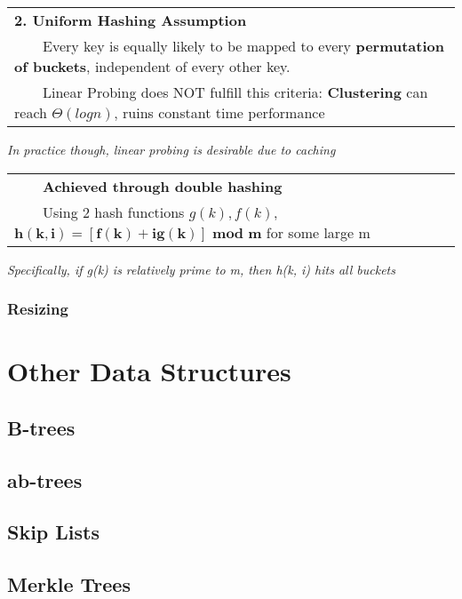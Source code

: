 \documentclass{article}
\newcommand{\tabitem}{~~\llap{\textbullet}~~}
\begin{document}
    \noindent\begin{tabular}{l}
        \textbf{2. Uniform Hashing Assumption}\\
        \tabitem Every key is equally likely to be mapped to every \textbf{permutation of buckets}, independent of every other key.\\
        \tabitem Linear Probing does NOT fulfill this criteria: \textbf{Clustering} can reach $\Theta(logn)$, ruins constant time performance\\
    \end{tabular}

    \emph{In practice though, linear probing is desirable due to caching}

    \noindent\begin{tabular}{l}
        \tabitem\textbf{Achieved through double hashing}\\
        \tabitem Using 2 hash functions $g(k), f(k)$, $\bm{h(k, i) = [f(k) + ig(k)]}$ $\bm{mod}$ \textbf{m} for some large m\\
    \end{tabular}

    \emph{Specifically, if g(k) is relatively prime to m, then h(k, i) hits all buckets}

    \subsubsection{Resizing}

    

    \pagebreak

    \section{Other Data Structures}

    \subsection{B-trees}

    \subsection{ab-trees}

    \subsection{Skip Lists}

    \subsection{Merkle Trees}

    

    
\end{document}
